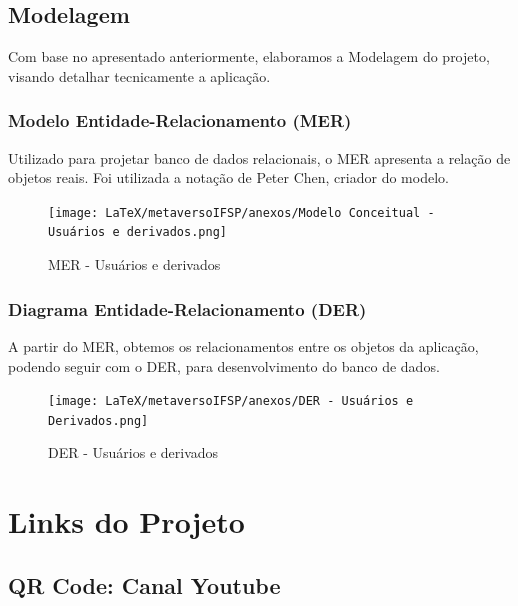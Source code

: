 \documentclass[
    12pt,               %
    openright,          %
    oneside,
    a4paper,            %
    MODELO,             %
    english,            %
    brazil              %
   ]{ifsp-spo-inf-ctds}
\begin{document}
\section{Modelagem}
Com base no apresentado anteriormente, elaboramos a Modelagem do projeto, visando detalhar tecnicamente a aplicação.

\subsection{Modelo Entidade-Relacionamento (MER)}
Utilizado para projetar banco de dados relacionais, o MER apresenta a relação de objetos reais. Foi utilizada a notação de Peter Chen, criador do modelo.

\begin{figure}[h]
\caption{MER - Usuários e derivados}
\centering 
\texttt{[image: LaTeX/metaversoIFSP/anexos/Modelo Conceitual - Usuários e derivados.png]} 
    \label{figura:mer-usuarios}
\end{figure}

\subsection{Diagrama Entidade-Relacionamento (DER)}
A partir do MER, obtemos os relacionamentos entre os objetos da aplicação, podendo seguir com o DER, para desenvolvimento do banco de dados.
\begin{figure}[h]
\caption{DER - Usuários e derivados}
\centering 
\texttt{[image: LaTeX/metaversoIFSP/anexos/DER - Usuários e Derivados.png]} 
    \label{figura:der-usuarios}
\end{figure}

\chapter{Links do Projeto}

\newcommand{\urlyoutube}{https://www.youtube.com/channel/UCNXlPi5ADeGx1tZbMo_xOqw/}
\newcommand{\urlblog}{https://metaversoifsp.blogspot.com/}
\newcommand{\urlsvn}{https://svn.spo.ifsp.edu.br/viewvc/A6PGP/S202201-PI-NOT/Metaverso/}
\newcommand{\urlgithub}{https://github.com/MetaversoIFSP/}

\section{QR Code: Canal Youtube}
    \begin{figure}
    \end{figure}
\end{document}
